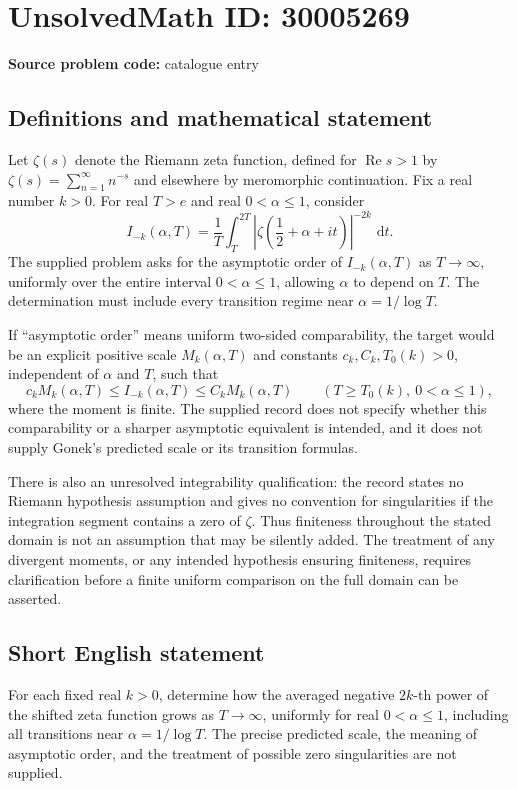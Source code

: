 \documentclass[11pt]{article}
\newcommand{\dd}{\,\mathrm{d}}
\begin{document}
\section*{UnsolvedMath ID: 30005269}
\textbf{Source problem code:} catalogue entry
\subsection{Definitions and mathematical statement}
Let \(\zeta(s)\) denote the Riemann zeta function, defined for \(\operatorname{Re}s>1\) by \(\zeta(s)=\sum_{n=1}^{\infty}n^{-s}\) and elsewhere by meromorphic continuation. Fix a real number \(k>0\). For real \(T>e\) and real \(0<\alpha\leq1\), consider
\[
I_{-k}(\alpha,T)=\frac{1}{T}\int_T^{2T}\left|\zeta\!\left(\frac12+\alpha+it\right)\right|^{-2k}\,\dd t.
\]
The supplied problem asks for the asymptotic order of \(I_{-k}(\alpha,T)\) as \(T\to\infty\), uniformly over the entire interval \(0<\alpha\leq1\), allowing \(\alpha\) to depend on \(T\). The determination must include every transition regime near \(\alpha=1/\log T\).

If ``asymptotic order'' means uniform two-sided comparability, the target would be an explicit positive scale \(M_k(\alpha,T)\) and constants \(c_k,C_k,T_0(k)>0\), independent of \(\alpha\) and \(T\), such that
\[
c_kM_k(\alpha,T)\leq I_{-k}(\alpha,T)\leq C_kM_k(\alpha,T)
\qquad(T\geq T_0(k),\ 0<\alpha\leq1),
\]
where the moment is finite. The supplied record does not specify whether this comparability or a sharper asymptotic equivalent is intended, and it does not supply Gonek's predicted scale or its transition formulas.

There is also an unresolved integrability qualification: the record states no Riemann hypothesis assumption and gives no convention for singularities if the integration segment contains a zero of \(\zeta\). Thus finiteness throughout the stated domain is not an assumption that may be silently added. The treatment of any divergent moments, or any intended hypothesis ensuring finiteness, requires clarification before a finite uniform comparison on the full domain can be asserted.
\subsection{Short English statement}
For each fixed real \(k>0\), determine how the averaged negative \(2k\)-th power of the shifted zeta function grows as \(T\to\infty\), uniformly for real \(0<\alpha\leq1\), including all transitions near \(\alpha=1/\log T\). The precise predicted scale, the meaning of asymptotic order, and the treatment of possible zero singularities are not supplied.
\end{document}
